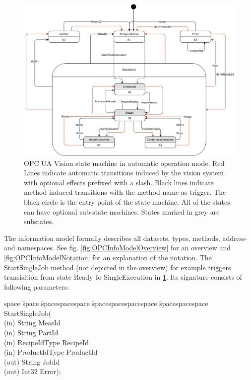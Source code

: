 \begin{figure}[ht]
    \centering
    \includegraphics[width=\textwidth]{img/OPCUAVisionVisionAutomaticModeStateMachineStates.pdf}
    \caption[OPC UA Vision state machine in automatic operation mode]{OPC UA Vision state machine in automatic operation mode. Red Lines indicate automatic transitions induced by the vision system with optional effects prefixed with a slash. Black lines indicate method induced transitions with the method name as trigger. The black circle is the entry point of the state machine. All of the states can have optional sub-state machines. States marked in grey are substates.\cite{VDMA2018OPCSpecification}}
    \label{fig:OPCStateMachineAutomatic}
\end{figure}

The information model formally describes all datasets, types, methods, address- and namespaces. See fig. \ref{fig:OPCInfoModelOverview} for an overview and \ref{fig:OPCInfoModelNotation} for an explanation of the notation. The StartSingleJob method (not depicted in the overview) for example triggers transisition from state Ready to SingleExecution in \ref{fig:OPCStateMachineAutomatic}. Its signature consists of following parameters:

\begin{tabbing}
    space \= space \= spacespacespace \= spacespacespacespace \= spacespacespace \kill
    \>  StartSingleJob(\\
    \>  \>  (in)	 \> 	String          \> MeasId\\
    \>  \>  (in)	 \> 	String          \> PartId\\
    \>  \>  (in)	 \> 	RecipeIdType    \> RecipeId\\
    \>  \>  (in)	 \> 	ProductIdType   \> ProductId\\
    \>  \>  (out)	 \> 	String          \> JobId\\
    \>  \>  (out)	 \> 	Int32           \> Error); 
\end{tabbing}

